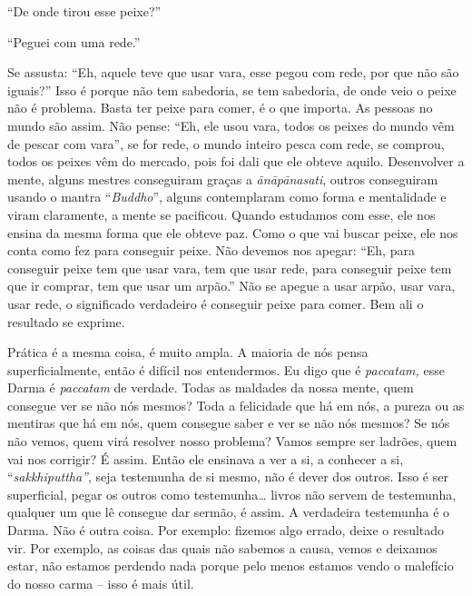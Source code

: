 “De onde tirou esse peixe?” 

“Peguei com uma rede.” 

Se assusta: “Eh, aquele teve que usar vara, esse pegou com rede, por
que não são iguais?” Isso é porque não tem sabedoria, se tem sabedoria,
de onde veio o peixe não é problema. Basta ter peixe para comer, é o
que importa. As pessoas no mundo são assim. Não pense: “Eh, ele usou
vara, todos os peixes do mundo vêm de pescar com vara”, se for rede, o
mundo inteiro pesca com rede, se comprou, todos os peixes vêm do
mercado, pois foi dali que ele obteve aquilo. Desenvolver a mente,
alguns mestres conseguiram graças a \textit{ānāpānasati}, outros
conseguiram usando o mantra “\textit{Buddho}”, alguns contemplaram como
forma e mentalidade e viram claramente, a mente se pacificou. Quando
estudamos com esse, ele nos ensina da mesma forma que ele obteve paz.
Como o que vai buscar peixe, ele nos conta como fez para conseguir
peixe. Não devemos nos apegar: “Eh, para conseguir peixe tem que usar
vara, tem que usar rede, para conseguir peixe tem que ir comprar, tem
que usar um arpão.” Não se apegue a usar arpão, usar vara, usar rede, o
significado verdadeiro é conseguir peixe para comer. Bem ali o
resultado se exprime. 

Prática é a mesma coisa, é muito ampla. A maioria de nós pensa
superficialmente, então é difícil nos entendermos. Eu digo que é
\textit{paccatam,} esse Darma é \textit{paccatam} de verdade. Todas as
maldades da nossa mente, quem consegue ver se não nós mesmos? Toda a
felicidade que há em nós, a pureza ou as mentiras que há em nós, quem
consegue saber e ver se não nós mesmos? Se nós não vemos, quem virá
resolver nosso problema? Vamos sempre ser ladrões, quem vai nos
corrigir? É assim. Então ele ensinava a ver a si, a conhecer a si,
“\textit{sakkhiputtha”}, seja testemunha de si mesmo, não é dever dos
outros. Isso é ser superficial, pegar os outros como testemunha… livros
não servem de testemunha, qualquer um que lê consegue dar sermão, é
assim. A verdadeira testemunha é o Darma. Não é outra coisa. Por
exemplo: fizemos algo errado, deixe o resultado vir. Por exemplo, as
coisas das quais não sabemos a causa, vemos e deixamos estar, não
estamos perdendo nada porque pelo menos estamos vendo o malefício do
nosso carma – isso é mais útil. 


